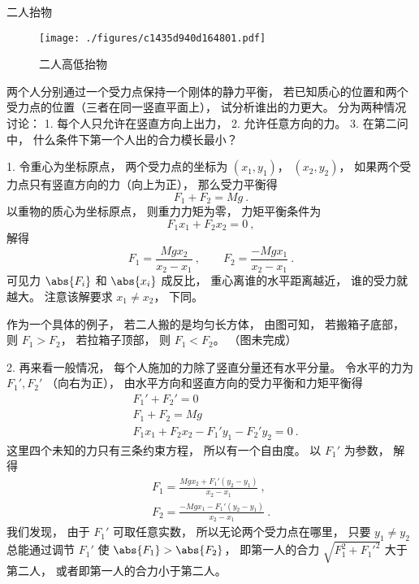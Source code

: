 \begin{example}{二人抬物}
\begin{figure}[ht]
\centering
\texttt{[image: ./figures/c1435d940d164801.pdf]}
\caption{二人高低抬物} \label{fig_RBSt_2}
\end{figure}
两个人分别通过一个受力点保持一个刚体的静力平衡， 若已知质心的位置和两个受力点的位置（三者在同一竖直平面上）， 试分析谁出的力更大。 分为两种情况讨论： 1. 每个人只允许在竖直方向上出力， 2. 允许任意方向的力。 3. 在第二问中， 什么条件下第一个人出的合力模长最小？

1. 令重心为坐标原点， 两个受力点的坐标为 $(x_1, y_1)$， $(x_2, y_2)$， 如果两个受力点只有竖直方向的力（向上为正）， 那么受力平衡得
\begin{equation}
F_1 + F_2 = Mg~.
\end{equation}
以重物的质心为坐标原点， 则重力力矩为零， 力矩平衡条件为
\begin{equation}
F_1 x_1 + F_2 x_2 = 0~,
\end{equation}
解得
\begin{equation}
F_1 = \frac{Mg x_2}{x_2 - x_1} ~,\qquad F_2 = \frac{-Mg x_1}{x_2 - x_1}~.
\end{equation}
可见力 $\abs{F_i}$ 和 $\abs{x_i}$ 成反比， 重心离谁的水平距离越近， 谁的受力就越大。 注意该解要求 $x_1 \ne x_2$， 下同。

作为一个具体的例子， 若二人搬的是均匀长方体， 由图可知， 若搬箱子底部， 则 $F_1 > F_2$， 若拉箱子顶部， 则 $F_1 < F_2$。 （图未完成）

2. 再来看一般情况， 每个人施加的力除了竖直分量还有水平分量。 令水平的力为 $F_1', F_2'$ （向右为正）， 由水平方向和竖直方向的受力平衡和力矩平衡得
\begin{equation}
\begin{aligned}
&F_1' + F_2' = 0\\
&F_1 + F_2 = Mg\\
&F_1 x_1 + F_2 x_2 - F_1' y_1 - F_2' y_2 = 0~.
\end{aligned}
\end{equation}
这里四个未知的力只有三条约束方程， 所以有一个自由度。 以 $F_1'$ 为参数， 解得
\begin{equation}\label{eq_RBSt_1}
\begin{aligned}
F_1 = \frac{Mg x_2 + F_1'(y_2 - y_1)}{x_2 - x_1}~,\\
F_2 = \frac{-Mg x_1 - F_1'(y_2 - y_1)}{x_2 - x_1}~.
\end{aligned}
\end{equation}
我们发现， 由于 $F_1'$ 可取任意实数， 所以无论两个受力点在哪里， 只要 $y_1 \ne y_2$ 总能通过调节 $F_1'$ 使 $\abs{F_1} > \abs{F_2}$， 即第一人的合力 $\sqrt{F_1^2 + F_1'^2}$ 大于第二人， 或者即第一人的合力小于第二人。


\end{example}
